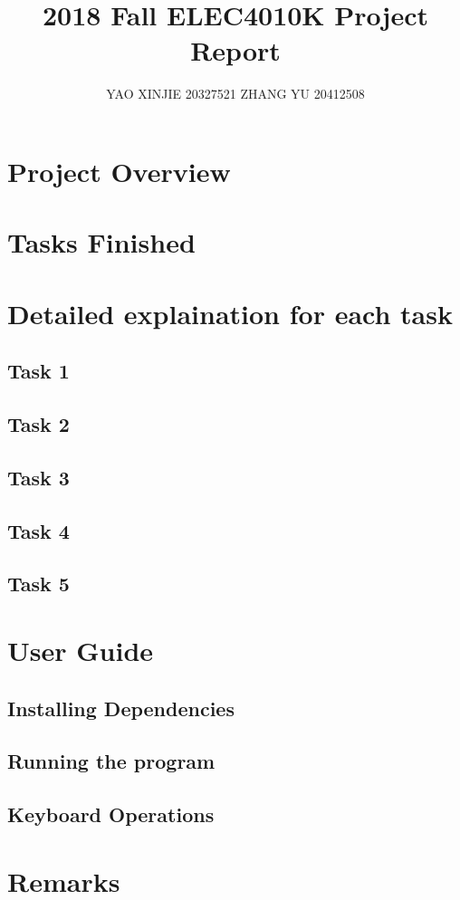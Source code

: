 \documentclass[12pt]{article}
\author{YAO XINJIE 20327521 ZHANG YU 20412508}
\title{2018 Fall ELEC4010K Project Report}
\begin{document}
\maketitle
\tableofcontents
\newpage
\section{Project Overview}

\section{Tasks Finished}

\section{Detailed explaination for each task}
\subsection{Task 1}

\subsection{Task 2}

\subsection{Task 3}

\subsection{Task 4}

\subsection{Task 5}

\section{User Guide}
\subsection{Installing Dependencies}

\subsection{Running the program}

\subsection{Keyboard Operations}

\section{Remarks}
\end{document}
